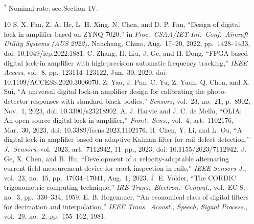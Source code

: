 \documentclass[journal]{IEEEtran}
\newcommand{\nom}{\textsuperscript{$\dagger$}}
\begin{document}
\nom{} Nominal rate; see Section~IV.

\begin{thebibliography}{10}
 S. X. Fan, Z. A. He, L. H. Xing, N. Chen, and D. P. Fan, ``Design of digital lock-in amplifier based on ZYNQ-7020,'' in \emph{Proc.\ CSAA/IET Int.\ Conf.\ Aircraft Utility Systems (AUS 2022)}, Nanchang, China, Aug.\ 17--20, 2022, pp.~1428--1433, doi: 10.1049/icp.2022.1881.
 C. Zhang, H. Liu, J. Ge, and H. Dong, ``FPGA-based digital lock-in amplifier with high-precision automatic frequency tracking,'' \emph{IEEE Access}, vol.~8, pp.~123114--123122, Jun.\ 30, 2020, doi: 10.1109/ACCESS.2020.3006070.
 Z. Yao, J. Pan, C. Yu, Z. Yuan, Q. Chen, and X. Sui, ``A universal digital lock-in amplifier design for calibrating the photo-detector responses with standard black-bodies,'' \emph{Sensors}, vol.~23, no.~21, p.~8902, Nov.\ 1, 2023, doi: 10.3390/s23218902.
 A. J. Harvie and J. C. de Mello, ``OLIA: An open-source digital lock-in amplifier,'' \emph{Front.\ Sens.}, vol.~4, art.\ 1102176, Mar.\ 30, 2023, doi: 10.3389/fsens.2023.1102176.
 H. Chen, Y. Li, and L. Ou, ``A digital lock-in amplifier based on adaptive Kalman filter for rail defect detection,'' \emph{J.\ Sensors}, vol.~2023, art.\ 7112942, 11~pp., 2023, doi: 10.1155/2023/7112942.
 J. Ge, X. Chen, and B. Hu, ``Development of a velocity-adaptable alternating current field measurement device for crack inspection in rails,'' \emph{IEEE Sensors J.}, vol.~23, no.~15, pp.~17034--17041, Aug.~1, 2023.
 J. E. Volder, ``The CORDIC trigonometric computing technique,'' \emph{IRE Trans.\ Electron.\ Comput.}, vol.~EC-8, no.~3, pp.~330--334, 1959.
 E. B. Hogenauer, ``An economical class of digital filters for decimation and interpolation,'' \emph{IEEE Trans.\ Acoust., Speech, Signal Process.}, vol.~29, no.~2, pp.~155--162, 1981.
\end{thebibliography}
\end{document}
